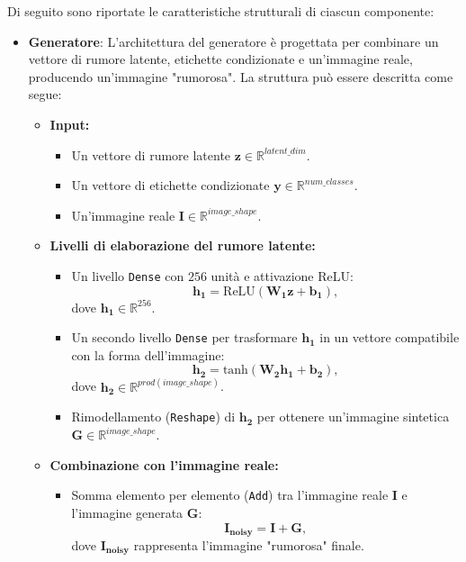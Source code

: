 Di seguito sono riportate le caratteristiche strutturali di ciascun componente:
\begin{itemize}
    \item \textbf{Generatore}: L'architettura del generatore è progettata per combinare un vettore di rumore latente, etichette condizionate e un'immagine reale, producendo un'immagine "rumorosa". La struttura può essere descritta come segue:
    \begin{itemize}
        \item \textbf{Input:} 
        \begin{itemize}
            \item Un vettore di rumore latente $\mathbf{z} \in \mathbb{R}^{latent\_dim}$.
            \item Un vettore di etichette condizionate $\mathbf{y} \in \mathbb{R}^{num\_classes}$.
            \item Un'immagine reale $\mathbf{I} \in \mathbb{R}^{image\_shape}$.
        \end{itemize}
        
        \item \textbf{Livelli di elaborazione del rumore latente:}
        \begin{itemize}
            \item Un livello \texttt{Dense} con $256$ unità e attivazione ReLU:
            \[
            \mathbf{h_1} = \text{ReLU}(\mathbf{W_1}\mathbf{z} + \mathbf{b_1}),
            \]
            dove $\mathbf{h_1} \in \mathbb{R}^{256}$.
            
            \item Un secondo livello \texttt{Dense} per trasformare $\mathbf{h_1}$ in un vettore compatibile con la forma dell'immagine:
            \[
            \mathbf{h_2} = \text{tanh}(\mathbf{W_2}\mathbf{h_1} + \mathbf{b_2}),
            \]
            dove $\mathbf{h_2} \in \mathbb{R}^{prod(image\_shape)}$.
            
            \item Rimodellamento (\texttt{Reshape}) di $\mathbf{h_2}$ per ottenere un'immagine sintetica $\mathbf{G} \in \mathbb{R}^{image\_shape}$.
        \end{itemize}
        
        \item \textbf{Combinazione con l'immagine reale:}
        \begin{itemize}
            \item Somma elemento per elemento (\texttt{Add}) tra l'immagine reale $\mathbf{I}$ e l'immagine generata $\mathbf{G}$:
            \[
            \mathbf{I_{noisy}} = \mathbf{I} + \mathbf{G},
            \]
            dove $\mathbf{I_{noisy}}$ rappresenta l'immagine "rumorosa" finale.
        \end{itemize}
        

\end{itemize}
\end{itemize}
